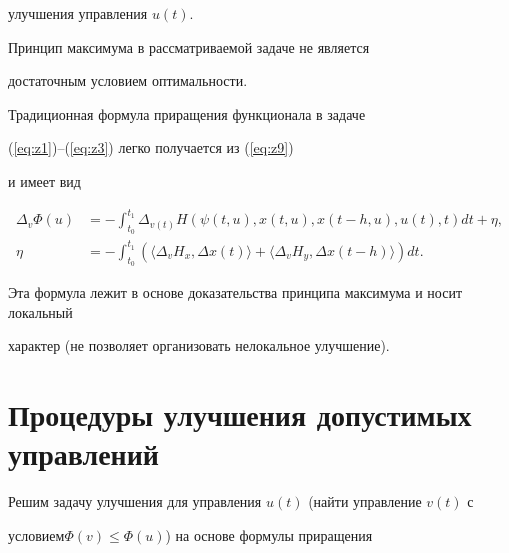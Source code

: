 улучшения управления $u(t)$.





\begin{note}


Принцип максимума в рассматриваемой задаче не является


достаточным условием оптимальности.


\end{note}





\begin{note}


Традиционная формула приращения функционала в задаче


(\ref{eq:z1})--(\ref{eq:z3}) легко получается из (\ref{eq:z9})


и имеет вид \cite{22}


\begin{align*}


\Delta_v\Phi(u)&=-\int_{t_0}^{t_1}


\Delta_{v(t)}H(\psi(t,u),x(t,u),x(t-h,u),u(t),t)dt+\eta, \\


%


\eta&=-\int_{t_0}^{t_1}


(\langle \Delta_v H_x,\Delta x(t)\rangle


+\langle \Delta_v H_y,\Delta x(t-h)\rangle)dt.


\end{align*}


Эта формула лежит в основе доказательства принципа максимума и носит локальный


характер (не позволяет организовать нелокальное улучшение).


\end{note}





\section{Процедуры улучшения допустимых управлений}





Решим задачу улучшения для управления $u(t)$ (найти управление $v(t)$ с


условием\linebreak $\Phi(v)\leq\Phi(u)$) на основе формулы приращения



